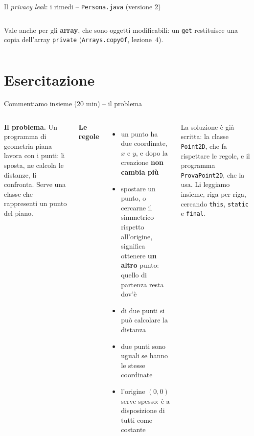 \documentclass[10pt,aspectratio=169]{beamer}
\begin{document}
\begin{frame}[fragile]{Il \emph{privacy leak}: i rimedi -- \texttt{Persona.java} (versione 2)}
\begin{columns}[T]
\vspace{0.1cm}
Vale anche per gli \textbf{array}, che sono oggetti modificabili: un \texttt{get} restituisce una copia dell'array \texttt{private} (\texttt{Arrays.copyOf}, lezione~4).
\end{columns}
\end{frame}

\section{Esercitazione}

\begin{frame}[fragile]{Commentiamo insieme (20 min) -- il problema}
\begin{columns}[T]
\small
\textbf{Il problema.} Un programma di geometria piana lavora con i punti: li sposta, ne calcola le distanze, li confronta. Serve una classe che rappresenti un punto del piano.

\vspace{0.2cm}
\textbf{Le regole}
\begin{itemize}\itemsep=3pt
    \item un punto ha due coordinate, $x$ e $y$, e dopo la creazione \textbf{non cambia più}
    \item spostare un punto, o cercarne il simmetrico rispetto all'origine, significa ottenere \textbf{un altro} punto: quello di partenza resta dov'è
    \item di due punti si può calcolare la distanza
    \item due punti sono uguali se hanno le stesse coordinate
    \item l'origine $(0, 0)$ serve spesso: è a disposizione di tutti come costante
\end{itemize}

\vspace{0.2cm}
La soluzione è già scritta: la classe \texttt{Point2D}, che fa rispettare le regole, e il programma \texttt{ProvaPoint2D}, che la usa. Li leggiamo insieme, riga per riga, cercando \texttt{this}, \texttt{static} e \texttt{final}.

\end{columns}
\end{frame}
\end{document}

